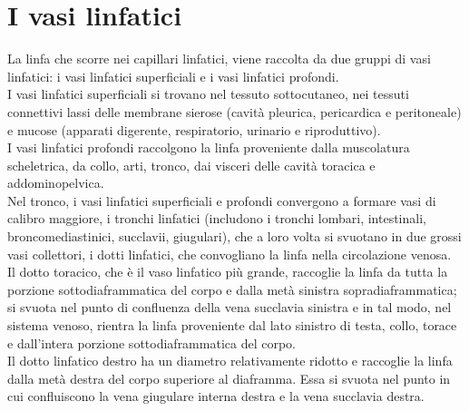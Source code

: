 \section{I vasi linfatici}
La linfa che scorre nei capillari linfatici, viene raccolta da due gruppi di vasi linfatici: i vasi linfatici 
superficiali e i vasi linfatici profondi.\\ 
I vasi linfatici superficiali si trovano nel tessuto sottocutaneo, nei tessuti connettivi lassi delle membrane sierose 
(cavità pleurica, pericardica e peritoneale) e mucose (apparati digerente, respiratorio, urinario e riproduttivo).\\ 
I vasi linfatici profondi raccolgono la linfa proveniente dalla muscolatura scheletrica, da collo, arti, tronco, 
dai visceri delle cavità toracica e addominopelvica\cite{BOOK1}.\\
Nel tronco, i vasi linfatici superficiali e profondi convergono a formare vasi di calibro maggiore, 
i tronchi linfatici (includono i tronchi lombari, intestinali, broncomediastinici, succlavii, giugulari), 
che a loro volta si svuotano in due grossi vasi collettori, i dotti linfatici, che convogliano la linfa 
nella circolazione venosa.\\  
Il dotto toracico, che è il vaso linfatico più grande, raccoglie la linfa da tutta la porzione sottodiaframmatica 
del corpo e dalla metà sinistra sopradiaframmatica; si svuota nel punto di confluenza della vena succlavia sinistra e 
in tal modo, nel sistema venoso, rientra la linfa proveniente dal lato sinistro di testa, collo, torace e 
dall’intera porzione sottodiaframmatica del corpo.\\ 
Il dotto linfatico destro ha un diametro relativamente ridotto e raccoglie la linfa dalla metà destra 
del corpo superiore al diaframma. Essa si svuota nel punto in cui confluiscono la vena giugulare interna destra e la 
vena succlavia destra\cite{BOOK1}.\\
 

